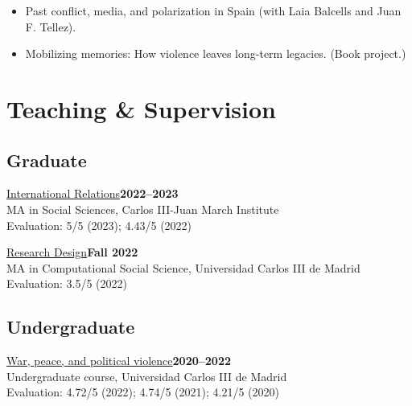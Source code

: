 \documentclass[a4paper, 12pt]{article}
\begin{document}
\begin{itemize}[leftmargin=*, nolistsep]
\item Past conflict, media, and polarization in Spain (with Laia Balcells and Juan F. Tellez).
\item Mobilizing memories: How violence leaves long-term legacies. (Book project.)
\end{itemize}

\section*{Teaching \& Supervision}


\subsection*{Graduate}

\noindent
\href{https://raw.githack.com/franvillamil/syllabi/master/current/syllabus_IR.pdf}{International Relations}\hfill\textbf{2022--2023}\\
{\small MA in Social Sciences, Carlos III-Juan March Institute}\\
{\small Evaluation: 5/5 (2023); 4.43/5 (2022)}
\vspace{10pt}

\noindent
\href{https://github.com/franvillamil/syllabi/blob/master/current/syllabus_research_design.pdf}{Research Design}\hfill\textbf{Fall 2022}\\
{\small MA in Computational Social Science, Universidad Carlos III de Madrid}\\
{\small Evaluation: 3.5/5 (2022)}

\vspace{-10pt}
\subsection*{Undergraduate}

\noindent
\href{https://github.com/franvillamil/syllabi/blob/master/current/syllabus_war_peace_political_violence.pdf}{War, peace, and political violence}\hfill\textbf{2020--2022}\\
{\small Undergraduate course, Universidad Carlos III de Madrid}\\
{\small Evaluation: 4.72/5 (2022); 4.74/5 (2021); 4.21/5 (2020)}
\vspace{10pt}
\end{document}
